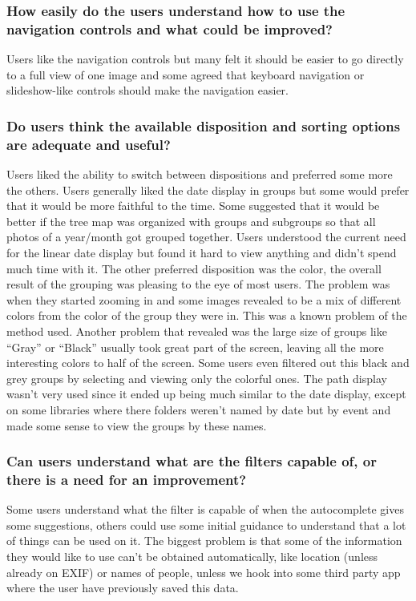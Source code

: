 \subsubsection{How easily do the users understand how to use the navigation controls and what could be improved?}
Users like the navigation controls but many felt it should be easier to go directly to a full view of one image and some agreed that keyboard navigation or slideshow-like controls should make the navigation easier.




\subsubsection{Do users think the available disposition and sorting options are adequate and useful?}
Users liked the ability to switch between dispositions and preferred some more the others.
Users generally liked the date display in groups but some would prefer that it would be more faithful to the time. Some suggested that it would be better if the tree map was organized with groups and subgroups so that all photos of a year/month got grouped together. Users understood the current need for the linear date display but found it hard to view anything and didn't spend much time with it.
The other preferred disposition was the color, the overall result of the grouping was pleasing to the eye of most users. The problem was when they started zooming in and some images revealed to be a mix of different colors from the color of the group they were in. This was a known problem of the method used. Another problem that revealed was the large size of groups like ``Gray'' or ``Black'' usually took great part of the screen, leaving all the more interesting colors to half of the screen. Some users even filtered out this black and grey groups by selecting and viewing only the colorful ones.
The path display wasn't very used since it ended up being much similar to the date display, except on some libraries where there folders weren't named by date but by event and made some sense to view the groups by these names. 




\subsubsection{Can users understand what are the filters capable of, or there is a need for an improvement?}
Some users understand what the filter is capable of when the autocomplete gives some suggestions, others could use some initial guidance to understand that a lot of things can be used on it. The biggest problem is that some of the information they would like to use can't be obtained automatically, like location (unless already on EXIF) or names of people, unless we hook into some third party app where the user have previously saved this data.




